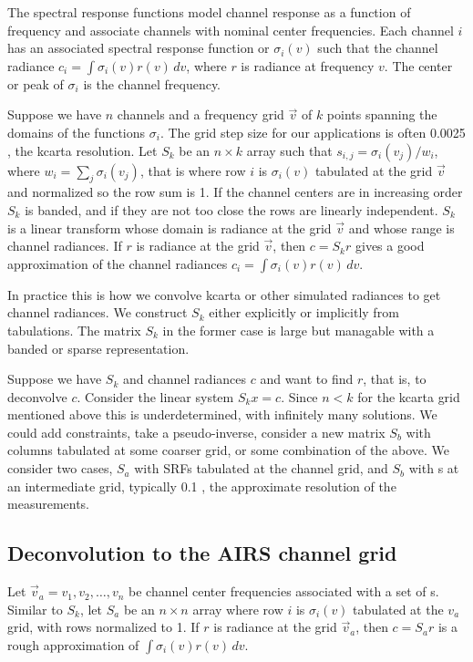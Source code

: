 \documentclass[12pt]{article}
\begin{document}
The {\airs} spectral response functions model channel response as 
a function of frequency and associate channels with nominal center
frequencies.  Each {\airs} channel $i$ has an associated spectral
response function or {\srf} $\sigma_i(v)$ such that the channel
radiance $c_i = \int \sigma_i(v)r(v)\,dv$, where $r$ is radiance at
frequency $v$.  The center or peak of $\sigma_i$ is the channel
frequency.

Suppose we have $n$ channels and a frequency grid $\vec v$ of $k$
points spanning the domains of the functions $\sigma_i$.  The grid
step size for our applications is often 0.0025 {\wn}, the kcarta
resolution.  Let $S_k$ be an $n\times k$ array such that $s_{i,j} =
\sigma_i(v_j)/w_i$, where $w_i = \sum_j \sigma_i(v_j)$, that is
where row $i$ is $\sigma_i(v)$ tabulated at the grid $\vec v$ and
normalized so the row sum is 1.  If the channel centers are in
increasing order $S_k$ is banded, and if they are not too close the
rows are linearly independent.  $S_k$ is a linear transform whose
domain is radiance at the grid $\vec v$ and whose range is channel
radiances.  If $r$ is radiance at the grid $\vec v$, then $c = S_k r$
gives a good approximation of the channel radiances $c_i = 
\int\sigma_i(v)r(v)\,dv$.

In practice this is how we convolve kcarta or other simulated
radiances to get {\airs} channel radiances.  We construct $S_k$
either explicitly or implicitly from {\airs} {\srf} tabulations.
The matrix $S_k$ in the former case is large but managable with a
banded or sparse representation.

Suppose we have $S_k$ and channel radiances $c$ and want to find
$r$, that is, to deconvolve $c$.  Consider the linear system $S_k x
= c$.  Since $n < k$ for the kcarta grid mentioned above this is
underdetermined, with infinitely many solutions.  We could add
constraints, take a pseudo-inverse, consider a new matrix $S_b$ with
columns tabulated at some coarser grid, or some combination of the
above.  We consider two cases, $S_a$ with SRFs tabulated at the
{\airs} channel grid, and $S_b$ with {\srf}s at an intermediate
grid, typically 0.1 {\wn}, the approximate resolution of the {\srf}
measurements.

\subsection{Deconvolution to the AIRS channel grid}

Let $\vec v_a = v_1,v_2,\ldots,v_n$ be channel center frequencies
associated with a set of {\srf}s.  Similar to $S_k$, let $S_a$ be an
$n\times n$ array where row $i$ is $\sigma_i(v)$ tabulated at the
$v_a$ grid, with rows normalized to 1.  If $r$ is radiance at the
grid $\vec v_a$, then $c = S_a r$ is a rough approximation of
$\int\sigma_i(v)r(v)\,dv$.
\end{document}
